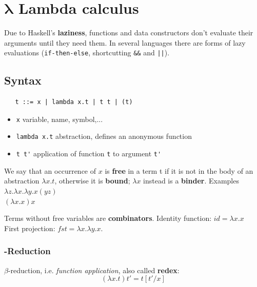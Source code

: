 \chapter{\texorpdfstring{$\bm{\lambda}$}{} Lambda calculus}

Due to Haskell's \textbf{laziness}, functions and data constructors don’t evaluate their
arguments until they need them.
In several languages there are forms of lazy evaluations (\texttt{if-then-else}, shortcutting \texttt{\&\&} and \texttt{||}).

\section{Syntax}


\begin{lstlisting}
   t ::= x | lambda x.t | t t | (t)
\end{lstlisting}
\begin{itemize}
   \item \lstinline|x| variable, name, symbol,...
   \item \lstinline|lambda x.t| abstraction, defines an anonymous function
   \item \lstinline|t t'| application of function \lstinline|t| to argument \lstinline|t'|
\end{itemize}

We say that an occurrence of $x$ is \textbf{free} in a term t if it is not in the
body of an abstraction $\lambda x. t$,
otherwise it is \textbf{bound};
$\lambda x$ instead is a \textbf{binder}.
Examples
$\lambda z. \lambda x. \lambda y. x (y z)$\\
$(\lambda x. x) x$

Terms without free variables are \textbf{combinators}.
Identity function: $id = \lambda x. x$\\
First projection: $fst = \lambda x. \lambda y. x$.

\subsection*{\texorpdfstring{\bm{$\beta $}}{}-Reduction}
$\beta $-reduction, i.e. \textit{function application}, also called \textbf{redex}:
\[(\lambda x.t)t' = t[t'/x]\]

